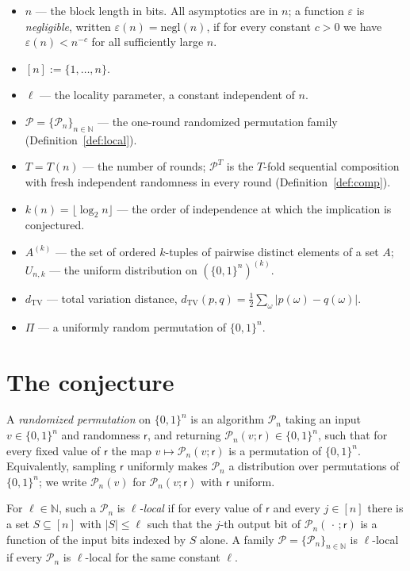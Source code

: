 \documentclass{conjura-conjecture}
\newcommand{\bits}{\{0,1\}}
\newcommand{\NN}{\mathbb{N}}
\newcommand{\cP}{\mathcal{P}}
\newcommand{\negl}{\mathrm{negl}}
\newcommand{\dTV}{d_{\mathrm{TV}}}
\newcommand{\rnd}{\mathsf{r}}
\begin{document}
\begin{itemize}
\item $n$ --- the block length in bits. All asymptotics are in $n$; a
  function $\varepsilon$ is \emph{negligible}, written
  $\varepsilon(n) = \negl(n)$, if for every constant $c > 0$ we have
  $\varepsilon(n) < n^{-c}$ for all sufficiently large $n$.
\item $[n] := \{1,\dots,n\}$.
\item $\ell$ --- the locality parameter, a constant independent of $n$.
\item $\cP = \{\cP_n\}_{n \in \NN}$ --- the one-round randomized
  permutation family (Definition~\ref{def:local}).
\item $T = T(n)$ --- the number of rounds; $\cP^{T}$ is the $T$-fold
  sequential composition with fresh independent randomness in every
  round (Definition~\ref{def:comp}).
\item $k(n) = \lfloor \log_2 n \rfloor$ --- the order of independence at
  which the implication is conjectured.
\item $A^{(k)}$ --- the set of ordered $k$-tuples of pairwise distinct
  elements of a set $A$; $U_{n,k}$ --- the uniform distribution on
  $(\bits^n)^{(k)}$.
\item $\dTV$ --- total variation distance,
  $\dTV(p,q) = \tfrac{1}{2}\sum_{\omega}|p(\omega) - q(\omega)|$.
\item $\Pi$ --- a uniformly random permutation of $\bits^n$.
\end{itemize}

\section{The conjecture}\label{sec:conjectures}

\begin{definition}
\label{def:local}
A \emph{randomized permutation} on $\bits^n$ is an algorithm $\cP_n$
taking an input $v \in \bits^n$ and randomness $\rnd$, and returning
$\cP_n(v;\rnd) \in \bits^n$, such that for every fixed value of $\rnd$
the map $v \mapsto \cP_n(v;\rnd)$ is a permutation of $\bits^n$.
Equivalently, sampling $\rnd$ uniformly makes $\cP_n$ a distribution
over permutations of $\bits^n$; we write $\cP_n(v)$ for $\cP_n(v;\rnd)$
with $\rnd$ uniform.

For $\ell \in \NN$, such a $\cP_n$ is \emph{$\ell$-local} if for every
value of $\rnd$ and every $j \in [n]$ there is a set $S \subseteq [n]$
with $|S| \le \ell$ such that the $j$-th output bit of
$\cP_n(\,\cdot\,;\rnd)$ is a function of the input bits indexed by $S$
alone. A family $\cP = \{\cP_n\}_{n \in \NN}$ is $\ell$-local if every
$\cP_n$ is $\ell$-local for the same constant $\ell$.
\end{definition}
\end{document}
